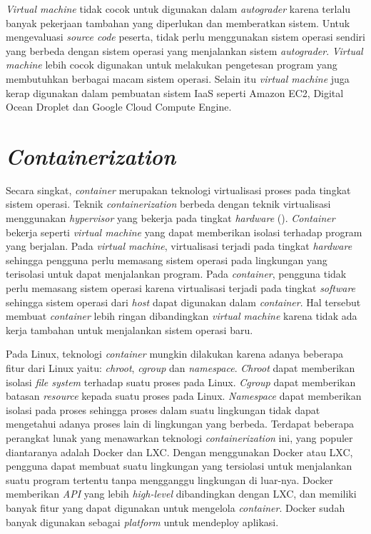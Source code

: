 \par \textit{Virtual machine} tidak cocok untuk digunakan dalam \textit{autograder} karena terlalu banyak pekerjaan tambahan yang diperlukan dan memberatkan sistem. Untuk mengevaluasi \textit{source code} peserta, tidak perlu menggunakan sistem operasi sendiri yang berbeda dengan sistem operasi yang menjalankan sistem \textit{autograder}. \textit{Virtual machine} lebih cocok digunakan untuk melakukan pengetesan program yang membutuhkan berbagai macam sistem operasi. Selain itu \textit{virtual machine} juga kerap digunakan dalam pembuatan sistem IaaS seperti Amazon EC2, Digital Ocean Droplet dan Google Cloud Compute Engine.

\section{\textit{Containerization}}


\par Secara singkat, \textit{container} merupakan teknologi virtualisasi proses pada tingkat sistem operasi. Teknik \textit{containerization} berbeda dengan teknik virtualisasi menggunakan \textit{hypervisor} yang bekerja pada tingkat \textit{hardware} (\cite{merkeldocker}). \textit{Container} bekerja seperti \textit{virtual machine} yang dapat memberikan isolasi terhadap program yang berjalan. Pada \textit{virtual machine}, virtualisasi terjadi pada tingkat \textit{hardware} sehingga pengguna perlu memasang sistem operasi pada lingkungan yang terisolasi untuk dapat menjalankan program. Pada \textit{container}, pengguna tidak perlu memasang sistem operasi karena virtualisasi terjadi pada tingkat \textit{software} sehingga sistem operasi dari \textit{host} dapat digunakan dalam \textit{container}. Hal tersebut membuat \textit{container} lebih ringan dibandingkan \textit{virtual machine} karena tidak ada kerja tambahan untuk menjalankan sistem operasi baru.

\par Pada Linux, teknologi \textit{container} mungkin dilakukan karena adanya beberapa fitur dari Linux yaitu: \textit{chroot}, \textit{cgroup} dan \textit{namespace}. \textit{Chroot} dapat memberikan isolasi \textit{file system} terhadap suatu proses pada Linux. \textit{Cgroup} dapat memberikan batasan \textit{resource} kepada suatu proses pada Linux. \textit{Namespace} dapat memberikan isolasi pada proses sehingga proses dalam suatu lingkungan tidak dapat mengetahui adanya proses lain di lingkungan yang berbeda. Terdapat beberapa perangkat lunak yang menawarkan teknologi \textit{containerization} ini, yang populer diantaranya adalah Docker dan LXC. Dengan menggunakan Docker atau LXC, pengguna dapat membuat suatu lingkungan yang tersiolasi untuk menjalankan suatu program tertentu tanpa mengganggu lingkungan di luar-nya. Docker memberikan \textit{API} yang lebih \textit{high-level} dibandingkan dengan LXC, dan memiliki banyak fitur yang dapat digunakan untuk mengelola \textit{container}. Docker sudah banyak digunakan sebagai \textit{platform} untuk mendeploy aplikasi.

